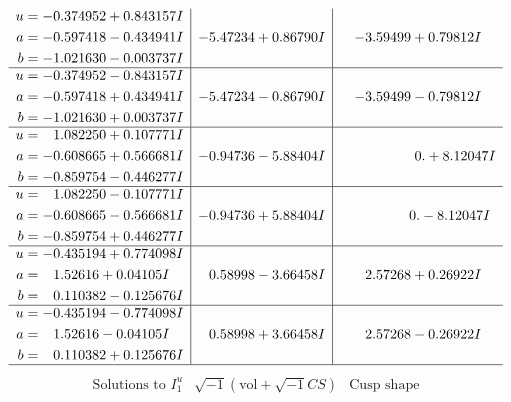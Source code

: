 \documentclass[1p]{elsarticle_modified}
\theoremstyle{definition}
\newcommand{\I}{\sqrt{-1}}
\begin{document}
$$\begin{array}{c|c|c}
\begin{aligned}
u &= -0.374952 + 0.843157 I \\
a &= -0.597418 - 0.434941 I \\
b &= -1.021630 - 0.003737 I\end{aligned}
 & -5.47234 + 0.86790 I & -3.59499 + 0.79812 I \\ \hline\begin{aligned}
u &= -0.374952 - 0.843157 I \\
a &= -0.597418 + 0.434941 I \\
b &= -1.021630 + 0.003737 I\end{aligned}
 & -5.47234 - 0.86790 I & -3.59499 - 0.79812 I \\ \hline\begin{aligned}
u &= \phantom{-}1.082250 + 0.107771 I \\
a &= -0.608665 + 0.566681 I \\
b &= -0.859754 - 0.446277 I\end{aligned}
 & -0.94736 - 5.88404 I & \phantom{-0.000000 -}0. + 8.12047 I \\ \hline\begin{aligned}
u &= \phantom{-}1.082250 - 0.107771 I \\
a &= -0.608665 - 0.566681 I \\
b &= -0.859754 + 0.446277 I\end{aligned}
 & -0.94736 + 5.88404 I & \phantom{-0.000000 } 0. - 8.12047 I \\ \hline\begin{aligned}
u &= -0.435194 + 0.774098 I \\
a &= \phantom{-}1.52616 + 0.04105 I \\
b &= \phantom{-}0.110382 - 0.125676 I\end{aligned}
 & \phantom{-}0.58998 - 3.66458 I & \phantom{-}2.57268 + 0.26922 I \\ \hline\begin{aligned}
u &= -0.435194 - 0.774098 I \\
a &= \phantom{-}1.52616 - 0.04105 I \\
b &= \phantom{-}0.110382 + 0.125676 I\end{aligned}
 & \phantom{-}0.58998 + 3.66458 I & \phantom{-}2.57268 - 0.26922 I\\
 \hline 
 \end{array}$$\newpage$$\begin{array}{c|c|c}  
\text{Solutions to }I^u_{1}& \I (\text{vol} + \sqrt{-1}CS) & \text{Cusp shape}\\
 \hline 
\begin{aligned}

\end{aligned}
\end{array}$$
\end{document}
